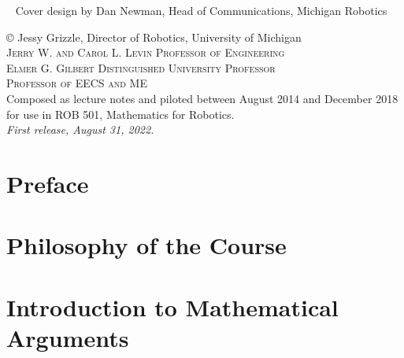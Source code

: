 \documentclass[letterpaper]{book}
\makeatletter
\renewcommand{\frontmatter}{\cleardoublepage\@mainmatterfalse}
\renewcommand{\mainmatter}{\cleardoublepage\@mainmattertrue}
\makeatother
\begin{document}
\endgroup

\clearpage


\begingroup
\thispagestyle{empty}


~\vfill
\thispagestyle{empty}
\noindent Cover design by Dan Newman, Head of Communications, Michigan Robotics

\vspace*{2cm}
\noindent\copyright{}	Jessy Grizzle,  Director of Robotics, University of Michigan	\\
\noindent \textsc{Jerry W. and Carol L. Levin Professor of Engineering\\
Elmer G. Gilbert Distinguished University Professor\\
Professor of EECS and ME}\\


\noindent Composed as lecture notes and piloted between August 2014 and December 2018 for use in ROB 501, Mathematics for Robotics.
\\ %

\noindent \textit{First release, August 31, 2022.} %


\endgroup


\frontmatter
\tableofcontents
\chapter{Preface}

\chapter{Philosophy of the Course}

% 
\mainmatter

\chapter{Introduction to Mathematical Arguments}
\label{chap:Intro}

\end{document}
